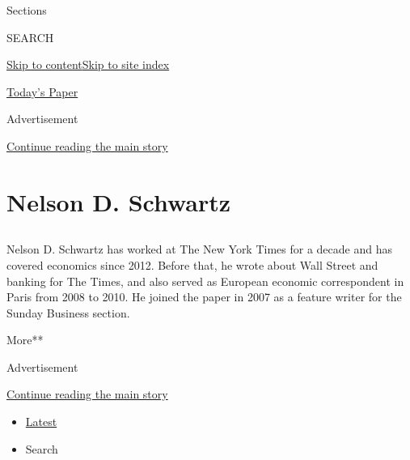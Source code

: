 Sections

SEARCH

\protect\hyperlink{site-content}{Skip to
content}\protect\hyperlink{site-index}{Skip to site index}

\href{https://myaccount.nytimes.com/auth/login?response_type=cookie\&client_id=vi}{}

\href{https://www.nytimes.com/section/todayspaper}{Today's Paper}

Advertisement

\protect\hyperlink{after-top}{Continue reading the main story}

\hypertarget{nelson-d-schwartz}{%
\section{Nelson D. Schwartz}\label{nelson-d-schwartz}}

\hypertarget{section}{%
\subsection{}\label{section}}

Nelson D. Schwartz has worked at The New York Times for a decade and has
covered economics since 2012. Before that, he wrote about Wall Street
and banking for The Times, and also served as European economic
correspondent in Paris from 2008 to 2010. He joined the paper in 2007 as
a feature writer for the Sunday Business section.

More**

Advertisement

\protect\hyperlink{after-mid1}{Continue reading the main story}

\begin{itemize}
\tightlist
\item
  \protect\hyperlink{stream-panel}{Latest}
\item
  Search
\end{itemize}

